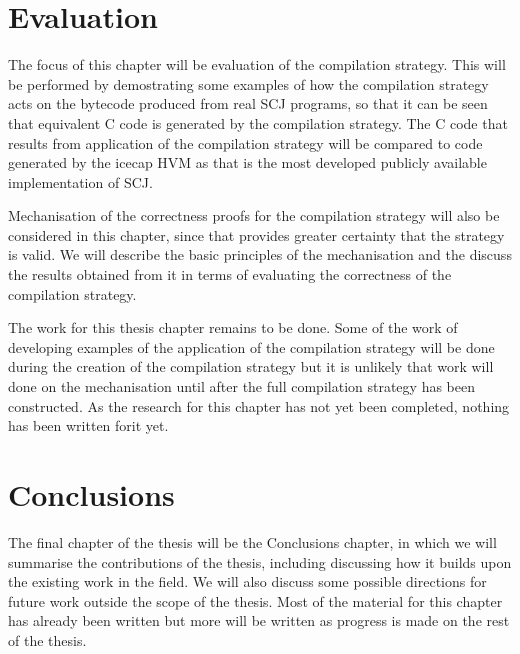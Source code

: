 \documentclass[a4paper,10pt]{report}
\begin{document}
\section{Evaluation}

The focus of this chapter will be evaluation of the compilation
strategy.
This will be performed by demostrating some examples of how the
compilation strategy acts on the bytecode produced from real SCJ
programs, so that it can be seen that equivalent C code is generated
by the compilation strategy.
The C code that results from application of the compilation strategy
will be compared to code generated by the icecap HVM as that is the
most developed publicly available implementation of SCJ.

Mechanisation of the correctness proofs for the compilation strategy
will also be considered in this chapter, since that provides greater
certainty that the strategy is valid.
We will describe the basic principles of the mechanisation and the
discuss the results obtained from it in terms of evaluating the
correctness of the compilation strategy.

The work for this thesis chapter remains to be done.
Some of the work of developing examples of the application of the
compilation strategy will be done during the creation of the
compilation strategy but it is unlikely that work will done on the
mechanisation until after the full compilation strategy has been
constructed.
As the research for this chapter has not yet been completed, nothing
has been written forit yet.

\section{Conclusions}

The final chapter of the thesis will be the Conclusions chapter, in
which we will summarise the contributions of the thesis, including
discussing how it builds upon the existing work in the field.
We will also discuss some possible directions for future work outside
the scope of the thesis.
Most of the material for this chapter has already been written but
more will be written as progress is made on the rest of the thesis. 

\end{document}

